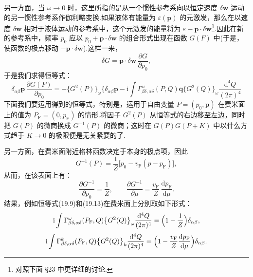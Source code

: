 另一方面，当 $\omega\to0$ 时，这里所指的是从一个惯性参考系向以恒定速度 $\delta\bm w$ 运动的另一惯性参考系作伽利略变换.如果液体有能量为 $\varepsilon(\bm{p})$ 的元激发，那么在以速度 $\delta\bm w$ 相对于液体运动的参考系中，这个元激发的能量将为 $\varepsilon-\bm{p}\cdot\delta\bm{w}$\footnote{对照下面 §23 中更详细的讨论.}.因此在新的参考系中，频率 $p_0$ 应以 $p_0+\bm{p}\cdot\delta\bm{w}$ 的组合形式出现在函数 $G(F)$ 中(于是，使函数的极点移动 $-\bm{p}\cdot\delta\bm{w}$).这样一来，
\begin{equation*}
  \delta G=\bm{p}\cdot\delta\bm{w}\,\frac{\partial G}{\partial p_0},
\end{equation*}
于是我们求得恒等式：
\begin{equation}
  \delta_{\alpha\beta}\bm{p}\,\frac{\partial G(P)}{\partial p_0}
  =-\bigl\{G^2(P)\bigr\}_{\omega}\biggl\{\delta_{\alpha\beta}\bm{p}-\mathrm{i}\int\Gamma^{\omega}_{\beta\delta,\alpha\delta}(P,Q)\bm{q}\bigl\{G^2(Q)\bigr\}_{\omega}\frac{\mathrm{d}^4Q}{(2\pi)^4}
\end{equation}
下面我们要运用得到的恒等式，特别是，运用于自由变量 $P=(p_0,\bm{p})$ 在费米面上的值为 $P_{\mathrm{F}}=(0,p_{\mathrm{F}})$ 的情形.将因子 $G^2(P)$ 从恒等式的右边移至左边，同时把 $G(P)$ 的微商换成 $G^{-1}(P)$ 的微商；这时在 $G(P)G(P+K)$ 中以什么方式趋于 $K\to0$ 的极限便是无关紧要的了.

另一方面，在费米面附近格林函数决定于本身的极点项，因此
\begin{equation*}
  G^{-1}(P)=\frac{1}{Z}\bigl[p_0-v_{\mathrm{F}}(p-p_{\mathrm{F}})\bigr],
\end{equation*}
从而，在该表面上有：
\begin{equation*}
  \frac{\partial G^{-1}}{\partial p_0}=\frac{1}{Z},\qquad
  \frac{\partial G^{-1}}{\partial\mu}=\frac{v_{\mathrm{F}}}{Z}\,\frac{\mathrm{d}p_{\mathrm{F}}}{\mathrm{d}\mu}.
\end{equation*}
结果，例如恒等式(19.9)和(19.13)在费米面上分别取如下形式：
\begin{equation}
  \mathrm{i}\int\Gamma^{\omega}_{\beta\delta,\alpha\delta}(P_{\mathrm{F}},Q)\bigl\{G^2(Q)\bigr\}_{\omega}\frac{\mathrm{d}^4Q}{(2\pi)^4}=\Bigl(1-\frac{1}{Z}\Bigr)\delta_{\alpha\beta},
\end{equation}
\begin{equation}
  \mathrm{i}\int\Gamma^{k}_{\beta\delta,\alpha\delta}(P_{\mathrm{F}},Q)\bigl\{G^2(Q)\bigr\}_{k}\frac{\mathrm{d}^4Q}{(2\pi)^4}=\Bigl(1-\frac{v_{\mathrm{F}}}{Z}\frac{\mathrm{d}p_{\mathrm{F}}}{\mathrm{d}\mu}\Bigr)\delta_{\alpha\beta}.
\end{equation}

